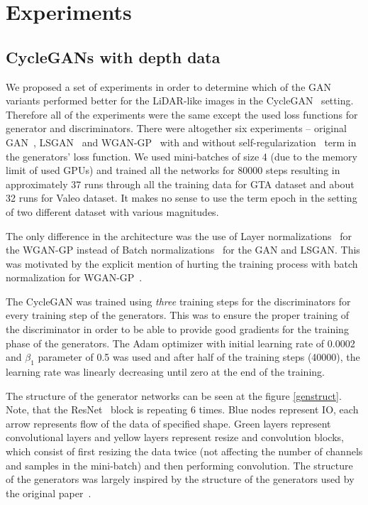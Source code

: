 \chapter{Experiments} \label{experiments}

\section{CycleGANs with depth data}

We proposed a set of experiments in order to determine which of the GAN variants performed better for the LiDAR-like images in the CycleGAN~\cite{cyclegan} setting. Therefore all of the experiments were the same except the used loss functions for generator and discriminators. There were altogether six experiments -- original GAN~\cite{origgan}, LSGAN~\cite{lsgan} and WGAN-GP~\cite{wgan-gp} with and without self-regularization~\cite{historypool} term in the generators' loss function. We used mini-batches of size 4 (due to the memory limit of used GPUs) and trained all the networks for 80000 steps resulting in approximately 37 runs through all the training data for GTA dataset and about 32 runs for Valeo dataset. It makes no sense to use the term epoch in the setting of two different dataset with various magnitudes.

The only difference in the architecture was the use of Layer normalizations~\cite{layernorm} for the WGAN-GP instead of Batch normalizations~\cite{batchnorm} for the GAN and LSGAN. This was motivated by the explicit mention of hurting the training process with batch normalization for WGAN-GP~\cite{wgan-gp}.

The CycleGAN was trained using {\em three} training steps for the discriminators for every training step of the generators. This was to ensure the proper training of the discriminator in order to be able to provide good gradients for the training phase of the generators. The Adam optimizer with initial learning rate of 0.0002 and $\beta_1$ parameter of 0.5 was used and after half of the training steps (40000), the learning rate was linearly decreasing until zero at the end of the training.

The structure of the generator networks can be seen at the figure \ref{genstruct}. Note, that the ResNet~\cite{resnet} block is repeating 6 times. Blue nodes represent IO, each arrow represents flow of the data of specified shape. Green layers represent convolutional layers and yellow layers represent resize and convolution blocks, which consist of first resizing the data twice (not affecting the number of channels and samples in the mini-batch) and then performing convolution. The structure of the generators was largely inspired by the structure of the generators used by the original paper~\cite{cyclegan}.

